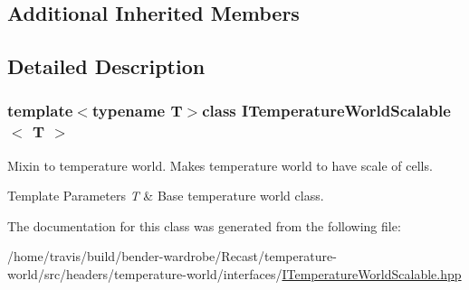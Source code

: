 \subsection*{Additional Inherited Members}


\subsection{Detailed Description}
\subsubsection*{template$<$typename T$>$class I\-Temperature\-World\-Scalable$<$ T $>$}

Mixin to temperature world. Makes temperature world to have scale of cells.


\begin{DoxyTemplParams}{Template Parameters}
{\em T} & Base temperature world class. \\
\hline
\end{DoxyTemplParams}


The documentation for this class was generated from the following file\-:\begin{DoxyCompactItemize}
\item 
/home/travis/build/bender-\/wardrobe/\-Recast/temperature-\/world/src/headers/temperature-\/world/interfaces/\hyperlink{_i_temperature_world_scalable_8hpp}{I\-Temperature\-World\-Scalable.\-hpp}\end{DoxyCompactItemize}
